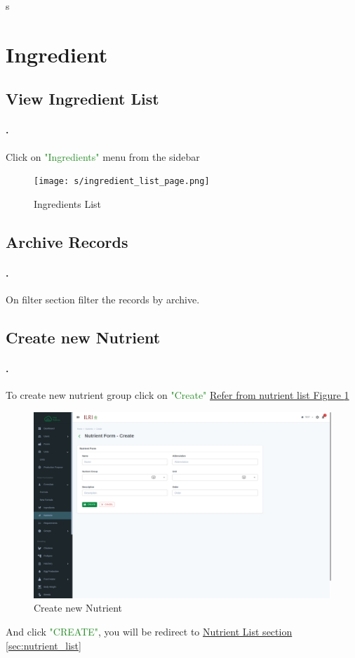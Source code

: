 s\section{Ingredient}\label{sec:ingredient}

\subsection{View Ingredient List}\label{sec:ingredient_list}
\setcounter{stepcounter}{1}
\paragraph{.}Click on \textcolor{ForestGreen}{"Ingredients"} menu from the sidebar
\begin{figure}[h!]
  	\texttt{[image: s/ingredient\_list\_page.png]}
  	\caption{Ingredients  List}
  	\label{fig:nutrient_list_page}
\end{figure}

\subsection{Archive Records}\label{sec:nutrient_list_archived}
\setcounter{stepcounter}{1}
\paragraph{.}On filter section filter the records by archive.

\subsection{Create new Nutrient }\label{sec:nutrient_create}
\setcounter{stepcounter}{1}
\paragraph{.}To create new nutrient group click on \textcolor{ForestGreen}{"Create"} \hyperref[fig:nutrient_list_page]{Refer from nutrient list Figure \ref{fig:nutrient_list_page}}
\begin{figure}[h!]
  	\includegraphics[width=15cm]{screenshots/nutrient_create_page.png}
  	\caption{Create new Nutrient }
  	\label{fig:nutrient_create_page}
\end{figure}
And click \textcolor{ForestGreen}{"CREATE"}, you will be redirect to  \hyperref[sec:nutrient_list]{Nutrient List section \ref{sec:nutrient_list}}

